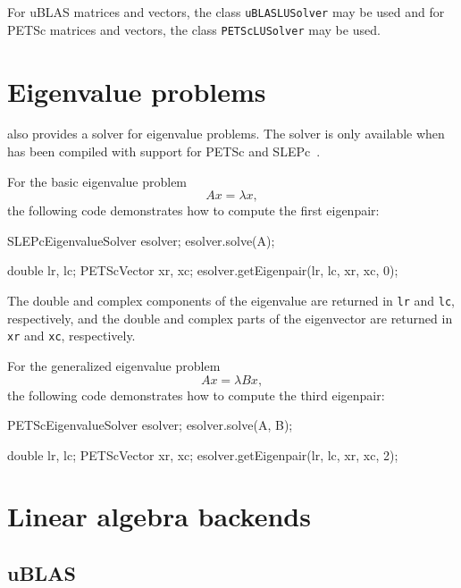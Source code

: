 For uBLAS matrices and vectors, the class \texttt{uBLASLUSolver} may
be used and for PETSc matrices and vectors, the class
\texttt{PETScLUSolver} may be used.

\section{Eigenvalue problems}

\dolfin{} also provides a solver for eigenvalue problems. 
The solver is only available when \dolfin{} has been compiled with support for 
PETSc and SLEPc~\cite{www:slepc}.

For the basic eigenvalue problem
%
\begin{equation}
  Ax = \lambda x,
\end{equation}
%
the following code demonstrates how to compute the first eigenpair:
%
\begin{code} 
SLEPcEigenvalueSolver esolver; 
esolver.solve(A);

double lr, lc;
PETScVector xr, xc;
esolver.getEigenpair(lr, lc, xr, xc, 0);
\end{code} 
%
The double and complex components of the eigenvalue are returned in \texttt{lr}
and \texttt{lc}, respectively, and the double and complex parts of the eigenvector
are returned in \texttt{xr} and \texttt{xc}, respectively.

For the generalized eigenvalue problem
\begin{equation}
 A x = \lambda B x,
\end{equation}
the following code demonstrates how to compute the third eigenpair:
\begin{code} 
PETScEigenvalueSolver esolver; 
esolver.solve(A, B);

double lr, lc;
PETScVector xr, xc;
esolver.getEigenpair(lr, lc, xr, xc, 2);
\end{code} 
\section{Linear algebra backends}

\subsection{uBLAS}

